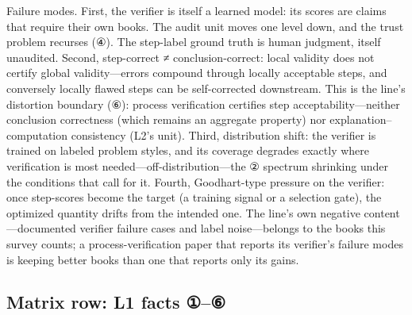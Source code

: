 \documentclass[11pt,a4paper]{article}
\begin{document}
Failure modes. First, the verifier is itself a learned model: its scores are claims that require their own books. The audit unit moves one level down, and the trust problem recurses (④). The step-label ground truth is human judgment, itself unaudited. Second, step-correct ≠ conclusion-correct: local validity does not certify global validity—errors compound through locally acceptable steps, and conversely locally flawed steps can be self-corrected downstream. This is the line's distortion boundary (⑥): process verification certifies step acceptability—neither conclusion correctness (which remains an aggregate property) nor explanation–computation consistency (L2's unit). Third, distribution shift: the verifier is trained on labeled problem styles, and its coverage degrades exactly where verification is most needed—off-distribution—the ② spectrum shrinking under the conditions that call for it. Fourth, Goodhart-type pressure on the verifier: once step-scores become the target (a training signal or a selection gate), the optimized quantity drifts from the intended one. The line's own negative content—documented verifier failure cases and label noise—belongs to the books this survey counts; a process-verification paper that reports its verifier's failure modes is keeping better books than one that reports only its gains.

\subsection{Matrix row: L1 facts ①–⑥}
\end{document}
